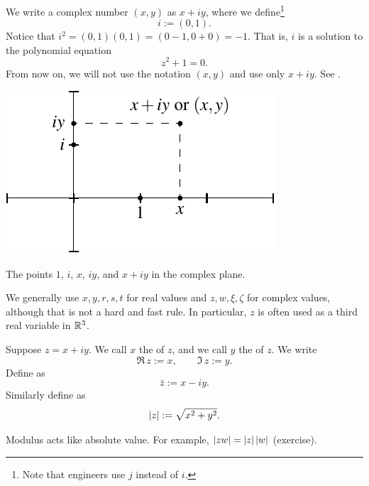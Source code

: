 We write a complex number $(x,y)$ as $x+iy$, where we
define\footnote{Note that engineers use $j$ instead of $i$.}
\begin{equation*}
i := (0,1) .
\end{equation*}
Notice that $i^2 = (0,1)(0,1) = (0-1,0+0) = -1$.
That is, $i$ is a solution to the polynomial equation
\begin{equation*}
z^2+1=0 .
\end{equation*}
From now on, we will not use the notation $(x,y)$ and use only $x+iy$.
See .
\begin{myfigureht}
\includegraphics{figures/complexplane}
\caption{The points $1$, $i$, $x$, $iy$, and $x+iy$ in the complex
plane.\label{fig:complexplane}}
\end{myfigureht}

We generally use $x,y,r,s,t$ for real values and $z,w,\xi,\zeta$
for complex values, although that is not a hard and fast rule.  In
particular, $z$ is often used as a third real variable in ${\mathbb{R}}^3$.

\begin{defn}
Suppose $z= x+iy$.
We call $x$ 
the \emph{} of $z$, and 
we call $y$
the \emph{} of $z$.  We write
\begin{equation*}
\Re\, z := x , \qquad
\Im\, z := y .
\end{equation*}
Define 
\emph{} as
\begin{equation*}
\bar{z} := x-iy .
\end{equation*}
Similarly define \emph{} as
\begin{equation*}
\lvert {z} \rvert := \sqrt{x^2+y^2} .
\end{equation*}
\end{defn}
Modulus acts like absolute value.  For example,
$\lvert {zw} \rvert = \lvert {z} \rvert \, \lvert {w} \rvert$ (exercise).

